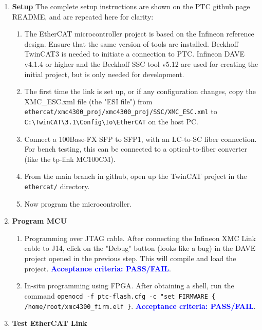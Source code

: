 \documentclass[a4paper,12pt]{article}
\begin{document}
    \begin{enumerate}
        \item \textbf{Setup} The complete setup instructions are shown on the PTC github page README, and are repeated here for clarity:
            \begin{enumerate}
                \item The EtherCAT microcontroller project is based on the Infineon reference design. Ensure that the same version of tools are installed. Beckhoff TwinCAT3 is needed to initiate a connection to PTC. Infineon DAVE v4.1.4 or higher and the Beckhoff SSC tool v5.12 are used for creating the initial project, but is only needed for development.
                \item The first time the link is set up, or if any configuration changes, copy the XMC\_ESC.xml file (the "ESI file") from \verb|ethercat/xmc4300_proj/xmc4300_proj/SSC/XMC_ESC.xml| to
                \verb|C:\TwinCAT\3.1\Config\Io\EtherCAT| on the host PC.
                \item Connect a 100Base-FX SFP to SFP1, with an LC-to-SC fiber connection. For bench testing, this can be connected to a optical-to-fiber converter (like the tp-link MC100CM). 
                \item From the main branch in github, open up the TwinCAT project in the \texttt{ethercat/} directory.
                \item Now program the microcontroller.
            \end{enumerate}
        \item \textbf{Program MCU}
            \begin{enumerate}
                \item Programming over JTAG cable. After connecting the Infineon XMC Link cable to J14, click on the "Debug" button (looks like a bug) in the DAVE project opened in the previous step. This will compile and load the project. \textcolor{blue}{\textbf{Acceptance criteria: PASS/FAIL}}.
                \item In-situ programming using FPGA. After obtaining a shell, run the command \newline \verb|openocd -f ptc-flash.cfg -c "set FIRMWARE { /home/root/xmc4300_firm.elf }|.
                \textcolor{blue}{\textbf{Acceptance criteria: PASS/FAIL}}.
            \end{enumerate}
        \item \textbf{Test EtherCAT Link}
        \begin{enumerate}

\end{enumerate}
\end{enumerate}
\end{document}
